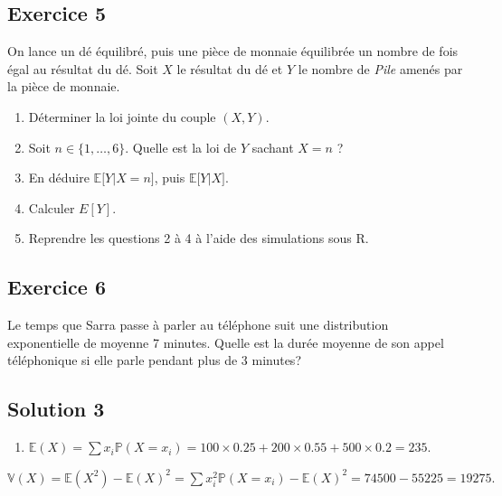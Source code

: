 \documentclass[
]{book}
\providecommand{\tightlist}{%
  \setlength{\itemsep}{0pt}\setlength{\parskip}{0pt}}
\theoremstyle{definition}
\theoremstyle{definition}
\theoremstyle{definition}
\theoremstyle{remark}
\begin{document}
\hypertarget{exercice-5}{%
\subsection*{Exercice 5}\label{exercice-5}}

On lance un dé équilibré, puis une pièce de monnaie équilibrée un nombre de fois égal au résultat
du dé. Soit \(X\) le résultat du dé et \(Y\) le nombre de \emph{Pile} amenés par la pièce de monnaie.

\begin{enumerate}
\def\labelenumi{\arabic{enumi}.}
\item
  Déterminer la loi jointe du couple \((X, Y )\).
\item
  Soit \(n \in \{1, \ldots, 6\}\). Quelle est la loi de \(Y\) sachant \(X = n\) ?
\item
  En déduire \(\mathbb{E}\bigl[Y |X = n\bigr]\), puis \(\mathbb{E}\bigl[Y |X\bigr]\).
\item
  Calculer \(E[Y]\).
\item
  Reprendre les questions 2 à 4 à l'aide des simulations sous R.
\end{enumerate}

\hypertarget{exercice-6}{%
\subsection*{Exercice 6}\label{exercice-6}}

Le temps que Sarra passe à parler au téléphone suit une distribution exponentielle de moyenne 7 minutes. Quelle est la durée moyenne de son appel téléphonique si elle parle pendant plus de 3 minutes?

\hypertarget{solution-3}{%
\subsection*{Solution 3}\label{solution-3}}

\begin{enumerate}
\def\labelenumi{\arabic{enumi}.}
\tightlist
\item
  \(\mathbb{E}(X)=\sum x_i\mathbb{P}(X=x_i)=100\times 0.25+200\times0.55+500\times0.2=235.\)
\end{enumerate}

\(\mathbb{V}(X)=\mathbb{E}(X^2)-\mathbb{E}(X)^2=\sum x_i^2\mathbb{P}(X=x_i)-\mathbb{E}(X)^2=74500-55225=19275.\)
\end{document}
